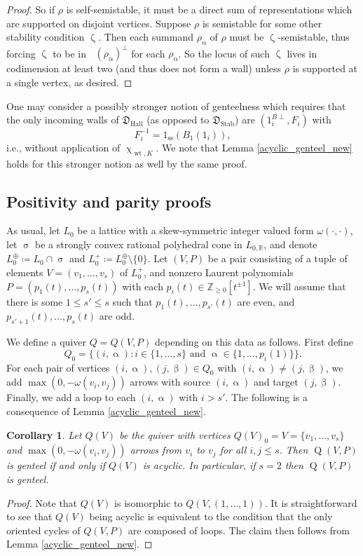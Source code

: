 \documentclass{amsart}
\DeclareMathOperator{\moBQ}{Q}
\newcommand{\BQ}[1]{\moBQ(#1)}
\DeclareMathOperator{\Wt}{wt}
\DeclareMathOperator{\udim}{\underline{\dim}}
\DeclareMathOperator{\Hall}{Hall}
\DeclareMathOperator{\Stab}{Stab}
\let\bb=\mathbb
\let\f=\mathfrak
\newcommand{\g}[1]{1_{#1}}
\renewcommand{\alpha}{\upalpha}
\renewcommand{\beta}{\upbeta}
\renewcommand{\zeta}{\upzeta}
\renewcommand{\chi}{\upchi}
\renewcommand{\sigma}{\upsigma}
\theoremstyle{plain}%
\newtheorem{cor}[thm]{Corollary}
\theoremstyle{definition}
\theoremstyle{remark}
\begin{document}
\begin{proof}
So if $\rho$ is self-semistable, it must be a direct sum of representations which are supported on disjoint vertices.  Suppose $\rho$ is semistable for some other stability condition $\zeta$.  Then each summand $\rho_{\alpha}$ of $\rho$ must be $\zeta$-semistable, thus forcing $\zeta$ to be in $\udim(\rho_{\alpha})^{\perp}$ for each $\rho_{\alpha}$.  So the locus of such $\zeta$ lives in codimension at least two (and thus does not form a wall) unless $\rho$ is supported at a single vertex, as desired.
\end{proof}

One may consider a possibly stronger notion of genteelness which requires that the only incoming walls of $\f{D}_{\Hall}$ (as opposed to $\f{D}_{\Stab}$) are $(\g{i}^{B\perp},F_i)$ with \begin{equation*}
F_i^{-1}=1_{\mathrm{ss}}(B_1(1_i)),
\end{equation*}
i.e., without application of $\chi_{\Wt,K}$.  We note that Lemma \ref{acyclic_genteel_new} holds for this stronger notion as well by the same proof.

\subsection{Positivity and parity proofs}\label{PosPar}

As usual, let $L_0$ be a lattice with a skew-symmetric integer valued form $\omega(\cdot,\cdot)$, let $\sigma$ be a strongly convex rational polyhedral cone in $L_{0,\bb{R}}$, and denote $L_0^{\oplus}\coloneqq L_0\cap \sigma$ and $L_0^+\coloneqq L_0^{\oplus}\setminus \{0\}$. Let $(V,P)$ be a pair consisting of a tuple of elements $V=(v_1,\ldots,v_s)$ of $L_0^+$, and nonzero Laurent polynomials $P=(p_1(t),\ldots,p_s(t))$ with each $p_i(t)\in\mathbb{Z}_{\geq 0}[t^{\pm 1}]$.  We will assume that there is some $1\leq s'\leq s$ such that $p_1(t),\ldots,p_{s'}(t)$ are even, and $p_{s'+1}(t),\ldots,p_s(t)$ are odd.  

We define a quiver $Q=Q(V,P)$ depending on this data as follows.  First define 
\[
Q_0=\{(i,\alpha)\colon i\in \{1,\ldots, s\} \textrm{ and }\alpha\in\{1,\ldots,p_i(1)\}\}.
\]
For each pair of vertices $(i,\alpha),(j,\beta)\in Q_0$ with $(i,\alpha)\neq (j,\beta)$, we add $\max(0,-\omega(v_i,v_j))$ arrows with source $(i,\alpha)$ and target $(j,\beta)$.  Finally, we add a loop to each $(i,\alpha)$ with $i>s'$. 
The following is a consequence of Lemma \ref{acyclic_genteel_new}.
\begin{cor}\label{GenteelCor}
Let $Q(V)$ be the quiver with vertices $Q(V)_0=V=\{v_1,\ldots,v_s\}$ and $\max(0,-\omega(v_i,v_j))$ arrows from $v_i$ to $v_j$ for all $i,j\leq s$.  Then $\BQ{V,P}$ is genteel if and only if $Q(V)$ is acyclic.  In particular, if $s=2$ then $\BQ{V,P}$ is genteel. 
\end{cor}
\begin{proof}
Note that $Q(V)$ is isomorphic to $Q(V,(1,\ldots,1))$.  It is straightforward to see that $Q(V)$ being acyclic is equivalent to the condition that the only oriented cycles of $Q(V,P)$ are composed of loops.  The claim then follows from Lemma \ref{acyclic_genteel_new}.
\end{proof}
\end{document}
